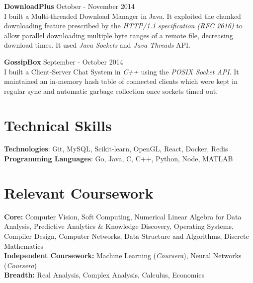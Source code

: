 \documentclass[margin,line]{res}
\begin{document}
\begin{resume}
  \vspace*{-2.5mm}

  {\bf DownloadPlus} \hfill October - November 2014 \\
  	I built a Multi-threaded Download Manager in Java. It exploited the chunked downloading feature prescribed by the {\it HTTP/1.1 specification (RFC 2616)} to allow parallel downloading multiple byte ranges of a remote file, decreasing download times. It used {\it Java Sockets} and {\it Java Threads} API.

  \vspace*{-2.5mm}

  {\bf GossipBox} \hfill September - October 2014 \\
    I built a Client-Server Chat System in {\it C++} using the {\it POSIX Socket API}. It maintained an in-memory hash table of connected clients which were kept in regular sync and automatic garbage collection once sockets timed out.

\section{\sc Technical Skills}

  {\bf Technologies}: Git, MySQL, Scikit-learn, OpenGL, React, Docker, Redis \\
  {\bf Programming Languages}: Go, Java, C, C++, Python, Node, MATLAB

\section{\sc Relevant Coursework}

  {\bf Core:} Computer Vision, Soft Computing, Numerical Linear Algebra for Data Analysis, Predictive Analytics \& Knowledge Discovery, Operating Systems, Compiler Design, Computer Networks, Data Structure and Algorithms, Discrete Mathematics \\
  {\bf Independent Coursework:} Machine Learning ({\it Coursera}), Neural Networks ({\it Coursera}) \\
  {\bf Breadth:} Real Analysis, Complex Analysis, Calculus, Economics

\begin{comment}
\section{\sc Positions of Responsibility}

  {\bf Volunteer, National Service Scheme}, IIT Hyderabad \hfill 2012 - 2016 \\
    I donated clothes to {\it old-age homes}. I gave {\it lectures on Basic Science and Mathematics} to primary school students. I was actively involved in {\it planting and watering greens} around the campus and was a volunteer for the {\it campus cleanliness drive}.


\end{comment}
\end{resume}
\end{document}
